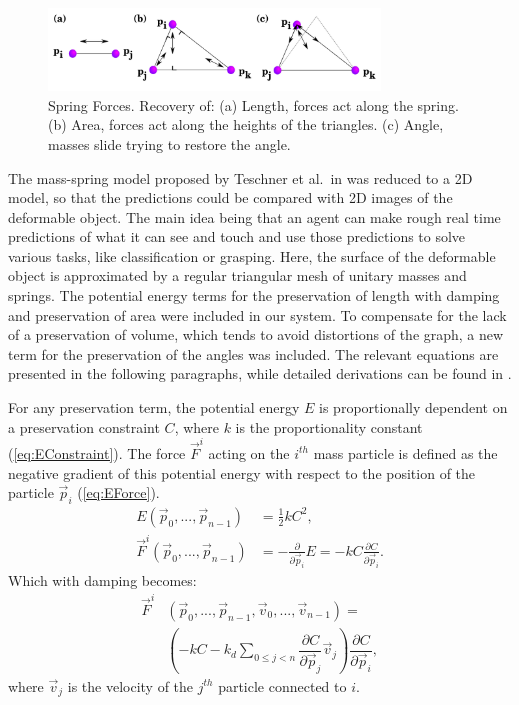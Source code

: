 \documentclass[journal]{IEEEtran}
\newcommand{\eref}[1]{(\ref{#1})}
\begin{document}
\begin{figure}[!t]
\centering
\includegraphics[width=88mm]{arrio1}
\caption{Spring Forces. Recovery of: (a) Length, forces act along the spring.  (b) Area, forces act along the heights of the triangles. (c) Angle, masses slide trying to restore the angle.}
\label{fig:forces}
\end{figure}

The mass-spring model proposed by Teschner et al.\ in \cite{Teschner2004} was reduced to a 2D model, so that the predictions could be compared with 2D images of the deformable object.  The main idea being that an agent can make rough real time predictions of what it can see and touch and use those predictions to solve various tasks, like classification or grasping.  Here, the surface of the deformable object is approximated by a regular triangular mesh of unitary masses and springs.  The potential energy terms for the preservation of length with damping and preservation of area were included in our system.  To compensate for the lack of a preservation of volume, which tends to avoid distortions of the graph, a new term for the preservation of the angles was included.  The relevant equations are presented in the following paragraphs, while detailed derivations can be found in \cite{Arriola2013thesis}.

For any preservation term, the potential energy $E$ is proportionally dependent on a preservation constraint $C$, where $k$ is the proportionality constant \eref{eq:EConstraint}.  The force $\vec{F}^i$ acting on the $i^{th}$ mass particle is defined as the negative gradient of this potential energy with respect to the position of the particle $\vec{p}_i$ \eref{eq:EForce}.
\begin{align}
 E(\vec{p}_0,...,\vec{p}_{n-1}) & = \frac{1}{2}kC^2, \label{eq:EConstraint} \\
 \vec{F}^i(\vec{p}_0,...,\vec{p}_{n-1}) & = -\frac{\partial}{\partial \vec{p}_i}E = -kC\frac{\partial C}{\partial \vec{p}_i}. \label{eq:EForce}
\end{align}
Which with damping becomes:
\begin{align}
 \label{eq:Fdamping}
 \vec{F}^i&(\vec{p}_0,...,\vec{p}_{n-1},\vec{v}_0,...,\vec{v}_{n-1}) = \nonumber \\
    &\left( -kC-k_d\sum_{0\le j < n} \dfrac{\partial C}{\partial \vec{p}_j}\vec{v}_j \right)
 \dfrac{\partial C}{\partial \vec{p}_i},
\end{align}
where $\vec{v}_j$ is the velocity of the $j^{th}$ particle connected to $i$.
\end{document}
